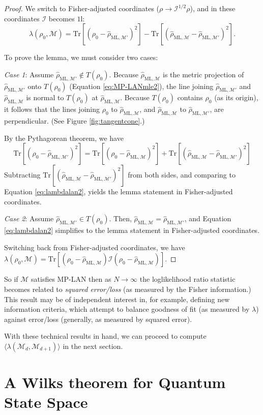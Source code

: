 \documentclass[aps,pra, twocolumn]{revtex4-1}
\newcommand{\M}{\mathcal{M}}
\newcommand{\Id}{\mathbb{I}}
\def\Id{1\!\mathrm{l}}
\newcommand{\rhohat}{\hat{\rho}}
\newcommand{\rhoML}[1]{\rhohat_{\scriptscriptstyle{\mathrm{ML},#1}}}
\begin{document}
\begin{proof}
We switch to Fisher-adjusted coordinates ($\rho \rightarrow \mathcal{I}^{1/2}\rho$), and in these coordinates $\mathcal{I}$ becomes $\Id$:
\begin{equation}
\label{eq:lambdalan2}
\lambda(\rho_{0}, \M) = \mathrm{Tr}[(\rho_{0} - \rhoML{\M'})^{2}]-  \mathrm{Tr}[(\rhoML{\M} - \rhoML{\M'})^{2}].
\end{equation}

To prove the lemma, we must consider two cases:

\emph{Case 1}: Assume $\rhoML{\M'} \not \in T(\rho_{0})$. Because $\rhoML{\M}$ is the metric projection of $\rhoML{\M'}$ onto $T(\rho_{0})$ (Equation \eqref{eq:MP-LANmle2}),  the line joining $\rhoML{\M'}$ and $\rhoML{\M}$ is normal to $T(\rho_{0})$ at $\rhoML{\M}$. Because $T(\rho_{0})$ contains $\rho_{0}$ (as its origin), it follows that the lines joining $\rho_{0}$ to $\rhoML{\M}$, and $\rhoML{\M}$ to $\rhoML{\M'}$, are perpendicular. (See Figure \ref{fig:tangentcone}.)

 By the Pythagorean theorem, we have
\[\mathrm{Tr}[(\rho_{0} -\rhoML{\M'})^{2}] =  \mathrm{Tr}[(\rho_{0} - \rhoML{\M})^{2}] + \mathrm{Tr}[(\rhoML{\M} - \rhoML{\M'})^{2}]\]
Subtracting $\mathrm{Tr}[(\rhoML{\M} - \rhoML{\M'})^{2}]$ from both sides, and comparing to Equation \eqref{eq:lambdalan2}, yields the lemma statement in Fisher-adjusted coordinates.

\emph{Case 2}: Assume $\rhoML{\M'} \in T(\rho_{0})$. Then, $\rhoML{\M}= \rhoML{\M'}$, and Equation \eqref{eq:lambdalan2} simplifies to the lemma statement in Fisher-adjusted coordinates.


Switching back from Fisher-adjusted coordinates, we have $\lambda(\rho_{0}, \M) = \mathrm{Tr}[(\rho_{0} - \rhoML{\M})\mathcal{I}(\rho_{0} - \rhoML{\M})]$.
\end{proof}

So if $\M$ satisfies MP-LAN then as $N\rightarrow \infty$ the loglikelihood ratio statistic becomes related to \emph{squared error/loss} (as measured by the Fisher information.) This result may be of independent interest in, for example, defining new information criteria, which attempt to balance goodness of fit (as measured by $\lambda$) against error/loss (generally, as measured by squared error).

With these technical results in hand, we can proceed to compute $\langle \lambda(\M_{d}, \M_{d+1})\rangle$ in the next section.

\section{A Wilks theorem for Quantum State Space}
\label{sec:computingllrs}
\end{document}
